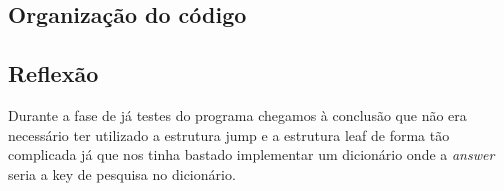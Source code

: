 \documentclass[12pt,a4paper]{article}
\begin{document}
\subsection{Organização do código}

\subsection{Reflexão}
Durante a fase de já testes do programa chegamos à conclusão que não era necessário ter utilizado a estrutura jump e a estrutura leaf de forma tão complicada já que nos tinha bastado implementar um dicionário onde a \textit{answer} seria a key de pesquisa no dicionário.


 
\end{document}
